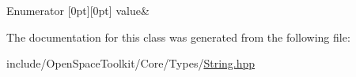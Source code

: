\begin{DoxyEnumFields}{Enumerator}
[0pt][0pt]{}\mbox{\label{classostk_1_1core_1_1types_1_1_has_to_string_af1322ad5dc303d4273e8c60e264c1f2dab24af8591da3b1fe369f1db9f7e44ef6}} 
value&\\
\hline

\end{DoxyEnumFields}


The documentation for this class was generated from the following file\+:\begin{DoxyCompactItemize}
\item 
include/\+Open\+Space\+Toolkit/\+Core/\+Types/\hyperlink{_string_8hpp}{String.\+hpp}\end{DoxyCompactItemize}
